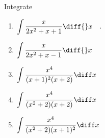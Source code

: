 Integrate 
\begin{enumerate}
\item \label{problemIntegrate x/(2x^2+x+1) dx}
$\displaystyle\int \frac{x }{2x^2+x+1}\diff{}x\quad .
$

\item \label{problemIntegrate x/(2x^2+x-1)dx}
$\displaystyle\int \frac{x }{2x^2+x-1}\diff{}x
$


\item $\displaystyle \int \frac{x^4 }{(x+1)^2(x+2) } \diff x$

\item $\displaystyle \int\frac{x^4 }{(x^2+2)(x+2) } \diff x$


\item \label{problemIntegral x^4/((x^2+2)(x+1)^2)} $\displaystyle\int \frac{x^4}{(x^2+2)(x+1)^2} \diff x $

\end{enumerate}
